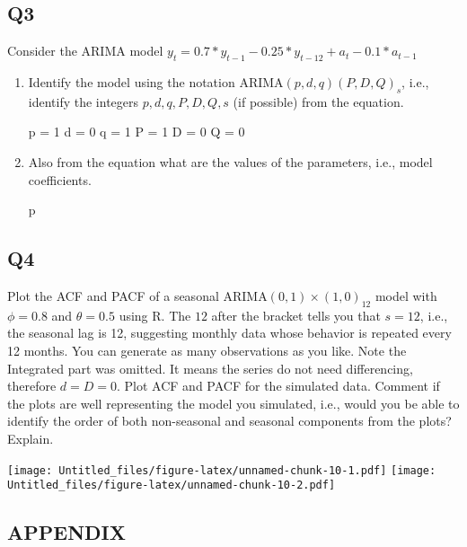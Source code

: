 \documentclass[
]{article}
\begin{document}
\hypertarget{q3}{%
\subsection{Q3}\label{q3}}

Consider the ARIMA model
\(y_t=0.7*y_{t-1}-0.25*y_{t-12}+a_t-0.1*a_{t-1}\)

\begin{enumerate}[label=(\alph*)]

\item Identify the model using the notation ARIMA$(p,d,q)(P,D,Q)_ s$, i.e., identify the integers $p,d,q,P,D,Q,s$ (if possible) from the equation.

p = 1
d = 0
q = 1
P = 1
D = 0
Q = 0

\item Also from the equation what are the values of the parameters, i.e., model coefficients. 

p


\end{enumerate}

\hypertarget{q4}{%
\subsection{Q4}\label{q4}}

Plot the ACF and PACF of a seasonal ARIMA\((0, 1)\times(1, 0)_{12}\)
model with \(\phi =0 .8\) and \(\theta = 0.5\) using R. The \(12\) after
the bracket tells you that \(s=12\), i.e., the seasonal lag is 12,
suggesting monthly data whose behavior is repeated every 12 months. You
can generate as many observations as you like. Note the Integrated part
was omitted. It means the series do not need differencing, therefore
\(d=D=0\). Plot ACF and PACF for the simulated data. Comment if the
plots are well representing the model you simulated, i.e., would you be
able to identify the order of both non-seasonal and seasonal components
from the plots? Explain.

\texttt{[image: Untitled\_files/figure-latex/unnamed-chunk-10-1.pdf]}
\texttt{[image: Untitled\_files/figure-latex/unnamed-chunk-10-2.pdf]}

\hypertarget{appendix}{%
\subsection{APPENDIX}\label{appendix}}
\end{document}
